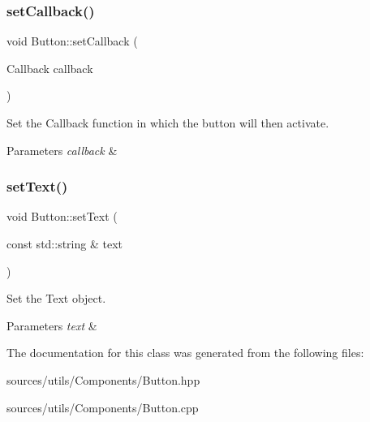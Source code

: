 \subsubsection{\texorpdfstring{set\+Callback()}{setCallback()}}
{\footnotesize\ttfamily void Button\+::set\+Callback (\begin{DoxyParamCaption}\item[{Callback}]{callback }\end{DoxyParamCaption})}



Set the Callback function in which the button will then activate. 


\begin{DoxyParams}{Parameters}
{\em callback} & \\
\hline
\end{DoxyParams}
\mbox{\label{classButton_ac6a233c876164a52d54ef7f1b3fb78d1}} 
\subsubsection{\texorpdfstring{set\+Text()}{setText()}}
{\footnotesize\ttfamily void Button\+::set\+Text (\begin{DoxyParamCaption}\item[{const std\+::string \&}]{text }\end{DoxyParamCaption})}



Set the Text object. 


\begin{DoxyParams}{Parameters}
{\em text} & \\
\hline
\end{DoxyParams}


The documentation for this class was generated from the following files\+:\begin{DoxyCompactItemize}
\item 
sources/utils/\+Components/Button.\+hpp\item 
sources/utils/\+Components/Button.\+cpp\end{DoxyCompactItemize}
